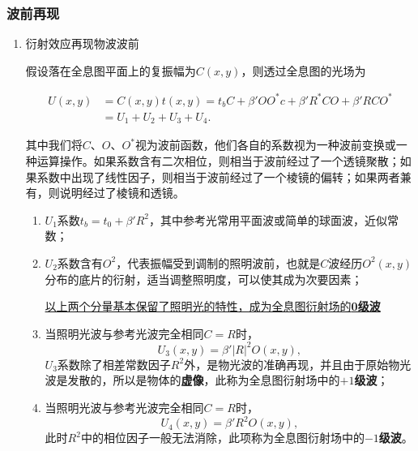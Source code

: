 \documentclass[UTF8]{ctexart}
\begin{document}
\subsubsection{波前再现}
\begin{enumerate}
    \item 衍射效应再现物波波前

    假设落在全息图平面上的复振幅为$C\left(x,y\right)$，则透过全息图的光场为

    \begin{equation}
        \begin{aligned}
            U\left( x,y \right)&=C\left( x,y \right)t\left( x,y \right)=t_bC + \beta'OO^*c + \beta'R^*CO + \beta'RCO^* \\&= U_1 + U_2 +U_3 +U_4.
        \end{aligned}
    \end{equation}

    其中我们将$C$、$O$、$O^*$视为波前函数，他们各自的系数视为一种波前变换或一种运算操作。如果系数含有二次相位，则相当于波前经过了一个透镜聚散；如果系数中出现了线性因子，则相当于波前经过了一个棱镜的偏转；如果两者兼有，则说明经过了棱镜和透镜。
    \begin{enumerate}
        \item $U_1$系数$t_{b}=t_0+\beta'R^2$，其中参考光常用平面波或简单的球面波，近似常数；
        \item $U_2$系数含有$O^{2}$，代表振幅受到调制的照明波前，也就是$C$波经历$O^2\left( x,y \right)$分布的底片的衍射，适当调整照明度，可以使其成为次要因素；

        \uline{以上两个分量基本保留了照明光的特性，成为全息图衍射场的\textbf{0级波}}
        \item 当照明光波与参考光波完全相同$C=R$时，
        \begin{equation}
            U_3\left( x,y \right) = \beta'\left|R\right|^2O\left( x,y \right),
        \end{equation}$U_3$系数除了相差常数因子$R^2$外，是物光波的准确再现，并且由于原始物光波是发散的，所以是物体的\textbf{虚像}，此称为全息图衍射场中的\textbf{$+1$级波}；
        \item 当照明光波与参考光波完全相同$C=R$时，
        \begin{equation}
            U_4\left( x,y \right) = \beta'R^2O\left( x,y \right),
        \end{equation}
        此时$R^2$中的相位因子一般无法消除，此项称为全息图衍射场中的\textbf{$-1$级波}。


\end{enumerate}
\end{enumerate}
\end{document}
